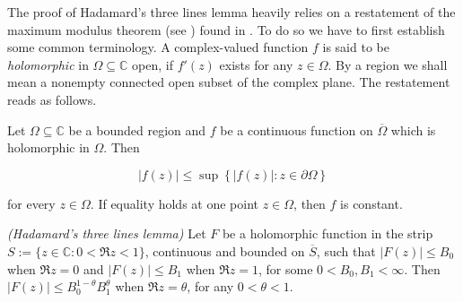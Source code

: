 The proof of Hadamard's three lines lemma heavily relies on a restatement of the maximum modulus theorem (see \cite[212]{rudin:rc_analysis:1987}) found in \cite[253]{rudin:rc_analysis:1987}. To do so we have to first establish some common terminology. A complex-valued function $f$ is said to be \emph{holomorphic} in $\Omega \subseteq \mathbb{C}$ open, if $f'(z)$ exists for any $z \in \Omega$. By a region we shall mean a nonempty connected open subset of the complex plane. The restatement reads as follows.

\begin{theorem*}
	Let $\Omega \subseteq \mathbb{C}$ be a bounded region and $f$ be a continuous function on $\overline{\Omega}$ which is holomorphic in $\Omega$. Then 

	\begin{equation*}
		\left| f(z)\right| \leqslant \sup\left\{ \left|f(z) \right| : z \in \partial\Omega\right\}
	\end{equation*}

	for every $z \in \Omega$. If equality holds at one point $z \in \Omega$, then $f$ is constant.
\end{theorem*}

\begin{mdframed}
	\begin{lemma}\emph{(Hadamard's three lines lemma)}
		Let $F$ be a holomorphic function in the strip $S := \{z \in \mathbb{C}: 0 < \Re z < 1\}$, continuous and bounded on $\overline{S}$, such that $\left| F(z)\right| \leqslant B_0$ when $\Re z = 0$ and $\left| F(z) \right| \leqslant B_1$ when $\Re z = 1$, for some $0 < B_0,B_1 < \infty$. Then $\left| F(z) \right| \leqslant B_0^{1 - \theta}B_1^\theta$ when $\Re z = \theta$, for any $0 < \theta < 1$.
	\end{lemma}
\end{mdframed}


